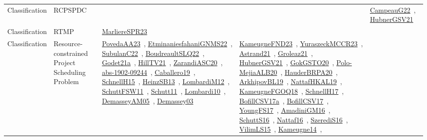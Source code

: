 {\begin{longtable}{lp{3cm}>{\raggedright\arraybackslash}p{6cm}>{\raggedright\arraybackslash}p{6cm}>{\raggedright\arraybackslash}p{8cm}}
\index{RCPSPDC}\index{Classification!RCPSPDC}Classification & RCPSPDC &  &  & \href{../works/CampeauG22.pdf}{CampeauG22}~\cite{CampeauG22}, \href{../works/HubnerGSV21.pdf}{HubnerGSV21}~\cite{HubnerGSV21}\\
\index{RTMP}\index{Classification!RTMP}Classification & RTMP & \href{../works/MarliereSPR23.pdf}{MarliereSPR23}~\cite{MarliereSPR23} &  & \\
\index{Resource-constrained Project Scheduling Problem}\index{Classification!Resource-constrained Project Scheduling Problem}Classification & Resource-constrained Project Scheduling Problem & \href{../works/PovedaAA23.pdf}{PovedaAA23}~\cite{PovedaAA23}, \href{../works/EtminaniesfahaniGNMS22.pdf}{EtminaniesfahaniGNMS22}~\cite{EtminaniesfahaniGNMS22}, \href{../works/SubulanC22.pdf}{SubulanC22}~\cite{SubulanC22}, \href{../works/BoudreaultSLQ22.pdf}{BoudreaultSLQ22}~\cite{BoudreaultSLQ22}, \href{../works/Godet21a.pdf}{Godet21a}~\cite{Godet21a}, \href{../works/HillTV21.pdf}{HillTV21}~\cite{HillTV21}, \href{../works/ZarandiASC20.pdf}{ZarandiASC20}~\cite{ZarandiASC20}, \href{../works/abs-1902-09244.pdf}{abs-1902-09244}~\cite{abs-1902-09244}, \href{../works/Caballero19.pdf}{Caballero19}~\cite{Caballero19}, \href{../works/SchnellH15.pdf}{SchnellH15}~\cite{SchnellH15}, \href{../works/HeinzSB13.pdf}{HeinzSB13}~\cite{HeinzSB13}, \href{../works/LombardiM12.pdf}{LombardiM12}~\cite{LombardiM12}, \href{../works/SchuttFSW11.pdf}{SchuttFSW11}~\cite{SchuttFSW11}, \href{../works/Schutt11.pdf}{Schutt11}~\cite{Schutt11}, \href{../works/Lombardi10.pdf}{Lombardi10}~\cite{Lombardi10}, \href{../works/DemasseyAM05.pdf}{DemasseyAM05}~\cite{DemasseyAM05}, \href{../works/Demassey03.pdf}{Demassey03}~\cite{Demassey03} & \href{../works/KameugneFND23.pdf}{KameugneFND23}~\cite{KameugneFND23}, \href{../works/YuraszeckMCCR23.pdf}{YuraszeckMCCR23}~\cite{YuraszeckMCCR23}, \href{../works/Astrand21.pdf}{Astrand21}~\cite{Astrand21}, \href{../works/Groleaz21.pdf}{Groleaz21}~\cite{Groleaz21}, \href{../works/HubnerGSV21.pdf}{HubnerGSV21}~\cite{HubnerGSV21}, \href{../works/GokGSTO20.pdf}{GokGSTO20}~\cite{GokGSTO20}, \href{../works/Polo-MejiaALB20.pdf}{Polo-MejiaALB20}~\cite{Polo-MejiaALB20}, \href{../works/HauderBRPA20.pdf}{HauderBRPA20}~\cite{HauderBRPA20}, \href{../works/ArkhipovBL19.pdf}{ArkhipovBL19}~\cite{ArkhipovBL19}, \href{../works/NattafHKAL19.pdf}{NattafHKAL19}~\cite{NattafHKAL19}, \href{../works/KameugneFGOQ18.pdf}{KameugneFGOQ18}~\cite{KameugneFGOQ18}, \href{../works/SchnellH17.pdf}{SchnellH17}~\cite{SchnellH17}, \href{../works/BofillCSV17a.pdf}{BofillCSV17a}~\cite{BofillCSV17a}, \href{../works/BofillCSV17.pdf}{BofillCSV17}~\cite{BofillCSV17}, \href{../works/YoungFS17.pdf}{YoungFS17}~\cite{YoungFS17}, \href{../works/AmadiniGM16.pdf}{AmadiniGM16}~\cite{AmadiniGM16}, \href{../works/SchuttS16.pdf}{SchuttS16}~\cite{SchuttS16}, \href{../works/Nattaf16.pdf}{Nattaf16}~\cite{Nattaf16}, \href{../works/SzerediS16.pdf}{SzerediS16}~\cite{SzerediS16}, \href{../works/VilimLS15.pdf}{VilimLS15}~\cite{VilimLS15}, \href{../works/Kameugne14.pdf}{Kameugne14}~\cite{Kameugne14}, 
\end{longtable}}
